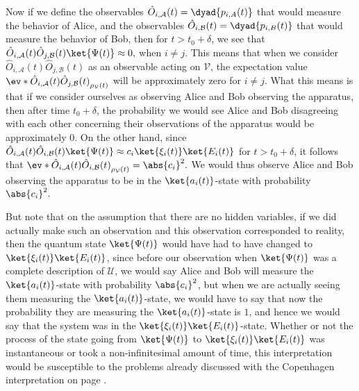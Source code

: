     Now if we define the observables $\hat{O}_{i,\mathcal{A}}(t)=\dyad{p_{i,A}(t)}$ that would measure the behavior of Alice, and the observables $\hat{O}_{i,\mathcal{B}}(t)=\dyad{p_{i,B}(t)}$ that would measure the behavior of Bob, then for $t>t_0+\delta$, we see that $\hat{O}_{i,\mathcal{A}}(t)\hat{O}_{j,\mathcal{B}}(t)\ket{\Psi(t)}\approx 0,$ when $i\neq j$. This means that when we consider $\hat{O}_{i,\mathcal{A}}(t)\hat{O}_{j,\mathcal{B}}(t)$ as an observable acting on $\mathcal{V}$,  the expectation value $\ev*{\hat{O}_{i,\mathcal{A}}(t)\hat{O}_{j,\mathcal{B}}(t)}_{\rho_\mathcal{V}(t)}$ will be approximately zero for $i\neq j$. What this means is that if we consider ourselves as observing Alice and Bob observing the apparatus, then after time $t_0+\delta$, the probability we would see Alice and Bob disagreeing with each other concerning their observations of the apparatus would be approximately 0. 
     On the other hand, since $\hat{O}_{i,\mathcal{A}}(t)\hat{O}_{i,\mathcal{B}}(t)\ket{\Psi(t)} \approx c_i \ket{\xi_i(t)}\ket{E_i(t)}$ for $t>t_0+\delta$, it follows that $\ev*{\hat{O}_{i,\mathcal{A}}(t)\hat{O}_{i,\mathcal{B}}(t)}_{\rho_\mathcal{V}(t)}=\abs{c_i}^2.$ 
     We would thus observe Alice and Bob observing the apparatus to be in the $\ket{a_i(t)}$-state with probability $\abs{c_i}^2.$ 
     
     But note that on the assumption that there are no hidden variables, if we did actually make such an observation and this observation corresponded to reality, then the quantum state $\ket{\Psi(t)}$ would have had to have changed to $\ket{\xi_i(t)}\ket{E_i(t)}$, since before our observation when $\ket{\Psi(t)}$ was a complete description of $\mathcal{U}$, we would say Alice and Bob will measure the $\ket{a_i(t)}$-state with probability $\abs{c_i}^2$, but when we are actually seeing them measuring the $\ket{a_i(t)}$-state, we would have to say that now the probability they are measuring the $\ket{a_i(t)}$-state is $1$, and hence we would say that the system was in the $\ket{\xi_i(t)}\ket{E_i(t)}$-state. Whether or not the process of the state going from $\ket{\Psi(t)}$ to $\ket{\xi_i(t)}\ket{E_i(t)}$ was instantaneous or took a non-infinitesimal amount of time, this interpretation would be susceptible to the problems already discussed with the Copenhagen interpretation on page \pageref{Copenhagenproblem}.
    

